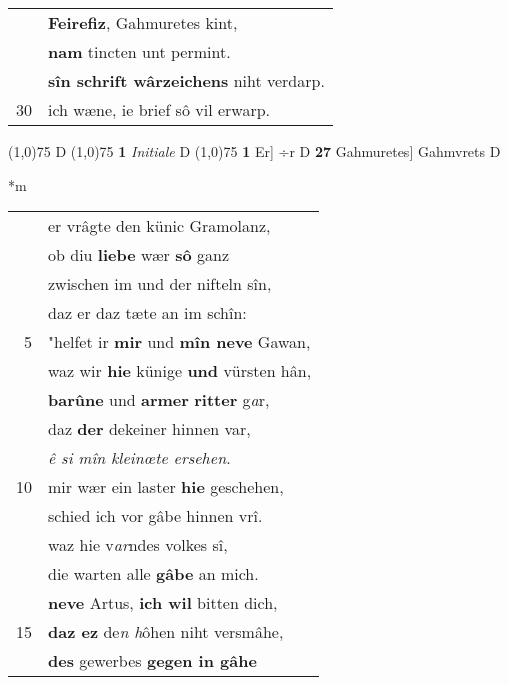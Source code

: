 \documentclass[8pt,a4paper,notitlepage]{article}
\begin{document}
\begin{table}[ht]
\begin{minipage}[t]{0.5\linewidth}
\begin{tabular}{rl}
 & \textbf{Feirefiz}, Gahmuretes kint,\\ 
 & \textbf{nam} tincten unt permint.\\ 
 & \textbf{sîn schrift wârzeichens} niht verdarp.\\ 
30 & ich wæne, ie brief sô vil erwarp.\\ 
\end{tabular}
\scriptsize
\line(1,0){75} \newline
D \newline
\line(1,0){75} \newline
\textbf{1} \textit{Initiale} D  \newline
\line(1,0){75} \newline
\textbf{1} Er] ÷r D \textbf{27} Gahmuretes] Gahmvrets D \newline
\end{minipage}
\hspace{0.5cm}
\begin{minipage}[t]{0.5\linewidth}
\small
\begin{center}*m
\end{center}
\begin{tabular}{rl}
 & er vrâgte den künic Gramolanz,\\ 
 & ob diu \textbf{liebe} wær \textbf{sô} ganz\\ 
 & zwischen im und der nifteln sîn,\\ 
 & daz er daz tæte an im schîn:\\ 
5 & "helfet ir \textbf{mir} und \textbf{mîn neve} Gawan,\\ 
 & waz wir \textbf{hie} künige \textbf{und} vürsten hân,\\ 
 & \textbf{barûne} und \textbf{armer} \textbf{ritter} g\textit{a}r,\\ 
 & daz \textbf{der} dekeiner hinnen var,\\ 
 & \textit{ê si mîn kleinœte ersehen}.\\ 
10 & mir wær ein laster \textbf{hie} geschehen,\\ 
 & schied ich vor gâbe hinnen vrî.\\ 
 & waz hie v\textit{ar}ndes volkes sî,\\ 
 & die warten alle \textbf{gâbe} an mich.\\ 
 & \textbf{neve} Artus, \textbf{ich wil} bitten dich,\\ 
15 & \textbf{daz ez} de\textit{n h}ôhen niht versmâhe,\\ 
 & \textbf{des} gewerbes \textbf{gegen in gâhe}\\ 

\end{tabular}
\end{minipage}
\end{table}
\end{document}
